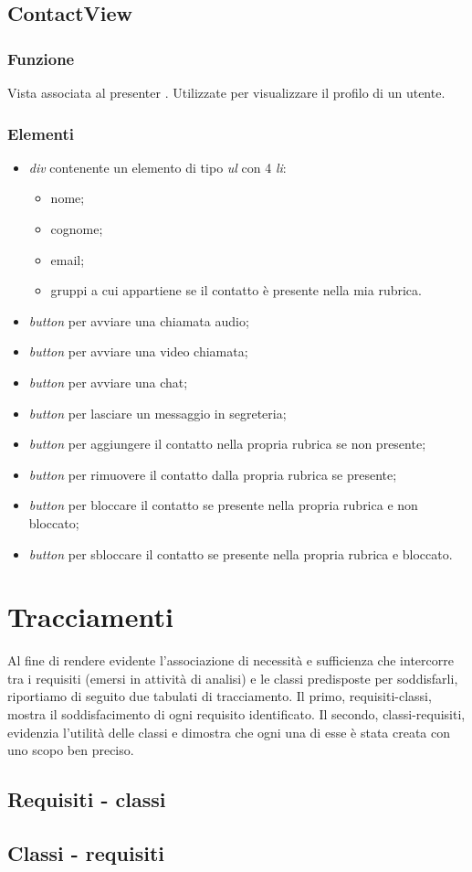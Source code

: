 \subsection{ContactView}
\subsubsection*{Funzione}
Vista associata al presenter . Utilizzate per visualizzare il profilo di un utente.

\subsubsection*{Elementi}
\begin{itemize}
\item \textit{div} contenente un elemento di tipo \textit{ul} con 4 \textit{li}:
\begin{itemize}
\item nome;
\item cognome;
\item email;
\item gruppi a cui appartiene se il contatto è presente nella mia rubrica.
\end{itemize}
\item \textit{button} per avviare una chiamata audio;
\item \textit{button} per avviare una video chiamata;
\item \textit{button} per avviare una chat;
\item \textit{button} per lasciare un messaggio in segreteria;
\item \textit{button} per aggiungere il contatto nella propria rubrica se non presente;
\item \textit{button} per rimuovere il contatto dalla propria rubrica se presente;
\item \textit{button} per bloccare il contatto se presente nella propria rubrica e non bloccato;
\item \textit{button} per sbloccare il contatto se presente nella propria rubrica e bloccato.
\end{itemize}

\clearpage

\section{Tracciamenti}

Al fine di rendere evidente l'associazione di necessità e sufficienza che intercorre tra i requisiti (emersi in attività di analisi) e le classi predisposte per soddisfarli, riportiamo di seguito due tabulati di tracciamento. Il primo, requisiti-classi, mostra il soddisfacimento di ogni requisito identificato. Il secondo, classi-requisiti, evidenzia l'utilità delle classi e dimostra che ogni una di esse è stata creata con uno scopo ben preciso.

\subsection{Requisiti - classi}

\subsection{Classi - requisiti}


